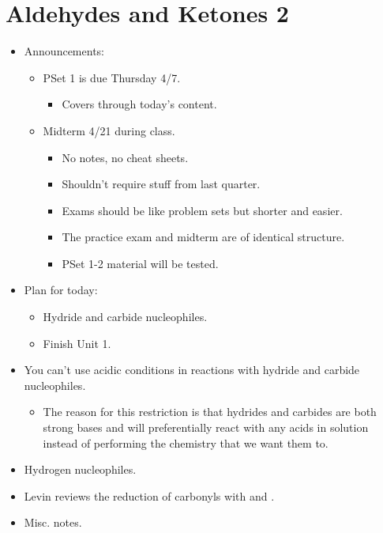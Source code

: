 \documentclass[../notes.tex]{subfiles}
\begin{document}
\section{Aldehydes and Ketones 2}
\begin{itemize}
    \item {}Announcements:
    \begin{itemize}
        \item PSet 1 is due Thursday 4/7.
        \begin{itemize}
            \item Covers through today's content.
        \end{itemize}
        \item Midterm 4/21 during class.
        \begin{itemize}
            \item No notes, no cheat sheets.
            \item Shouldn't require stuff from last quarter.
            \item Exams should be like problem sets but shorter and easier.
            \item The practice exam and midterm are of identical structure.
            \item PSet 1-2 material will be tested.
        \end{itemize}
    \end{itemize}
    \item Plan for today:
    \begin{itemize}
        \item Hydride and carbide nucleophiles.
        \item Finish Unit 1.
    \end{itemize}
    \item You can't use acidic conditions in reactions with hydride and carbide nucleophiles.
    \begin{itemize}
        \item The reason for this restriction is that hydrides and carbides are both strong bases and will preferentially react with any acids in solution instead of performing the chemistry that we want them to.
    \end{itemize}
    \item Hydrogen nucleophiles.
    \item Levin reviews the reduction of carbonyls with  and .
    \item Misc. notes.
    \begin{itemize}

\end{itemize}
\end{itemize}
\end{document}
